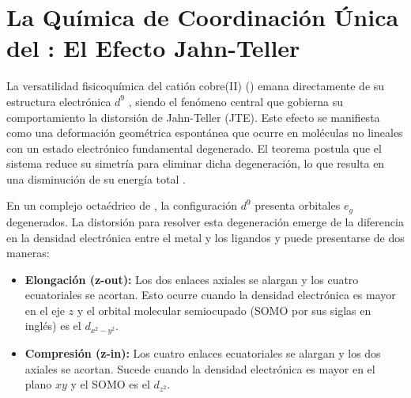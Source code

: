 \section{La Química de Coordinación Única del : El Efecto Jahn-Teller}

La versatilidad fisicoquímica del catión cobre(II) () emana directamente de su estructura electrónica \ce{[Ar]}$d^9$ , siendo el fenómeno central que gobierna su comportamiento la distorsión de Jahn-Teller (JTE). Este efecto se manifiesta como una deformación geométrica espontánea que ocurre en moléculas no lineales con un estado electrónico fundamental degenerado. El teorema postula que el sistema reduce su simetría para eliminar dicha degeneración, lo que resulta en una disminución de su energía total \cite{Cu-2019-01}.

En un complejo octaédrico de , la configuración \ce{[Ar]}$d^9$ presenta orbitales $e_g$ degenerados. La distorsión para resolver esta degeneración emerge de la diferencia en la densidad electrónica entre el metal y los ligandos  y puede presentarse de dos maneras:
\begin{itemize}
    \item \textbf{Elongación (z-out):} Los dos enlaces axiales se alargan y los cuatro ecuatoriales se acortan. Esto ocurre cuando la densidad electrónica es mayor en el eje $z$ y el orbital molecular semiocupado (SOMO por sus siglas en inglés) es el $d_{x^2-y^2}$.
    \item \textbf{Compresión (z-in):} Los cuatro enlaces ecuatoriales se alargan y los dos axiales se acortan. Sucede cuando la densidad electrónica es mayor en el plano $xy$ y el SOMO es el $d_{z^2}$.
\end{itemize}


